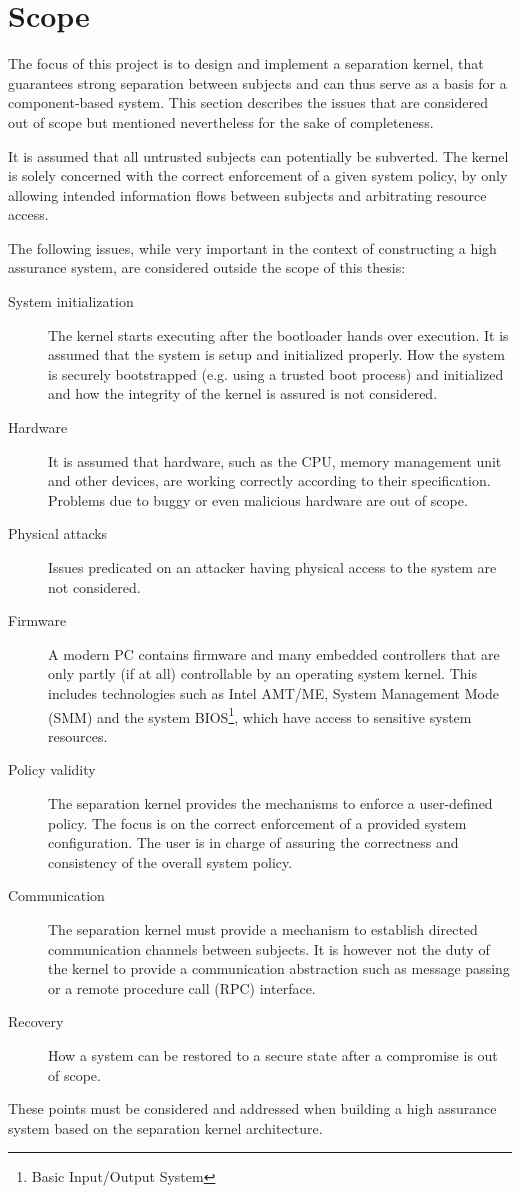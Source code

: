\section{Scope}
The focus of this project is to design and implement a separation kernel, that
guarantees strong separation between subjects and can thus serve as a basis for
a component-based system. This section describes the issues that are considered
out of scope but mentioned nevertheless for the sake of completeness.

It is assumed that all untrusted subjects can potentially be subverted. The
kernel is solely concerned with the correct enforcement of a given system
policy, by only allowing intended information flows between subjects and
arbitrating resource access.

The following issues, while very important in the context of constructing a
high assurance system, are considered outside the scope of this thesis:

\begin{description}
	\item[System initialization] The kernel starts executing after the
		bootloader hands over execution. It is assumed that the system is setup
		and initialized properly. How the system is securely bootstrapped (e.g.
		using a trusted boot process) and initialized and how the integrity of
		the kernel is assured is not considered.
	\item[Hardware] It is assumed that hardware, such as the CPU, memory
		management unit and other devices, are working correctly according to
		their specification. Problems due to buggy or even malicious hardware
		are out of scope.
	\item[Physical attacks] Issues predicated on an attacker having physical
		access to the system are not considered.
	\item[Firmware] A modern PC contains firmware and many embedded controllers
		that are only partly (if at all) controllable by an operating system
		kernel. This includes technologies such as Intel AMT/ME, System
		Management Mode (SMM) and the system
		BIOS\footnote{Basic Input/Output System}, which have access
		to sensitive system resources.
	\item[Policy validity] The separation kernel provides the mechanisms to
		enforce a user-defined policy. The focus is on the correct enforcement
		of a provided system configuration. The user is in charge of assuring
		the correctness and consistency of the overall system policy.
	\item[Communication] The separation kernel must provide a mechanism to
		establish directed communication channels between subjects.	It is
		however not the duty of the kernel to provide a	communication
		abstraction such as message passing or a remote procedure call (RPC)
		interface.
	\item[Recovery] How a system can be restored to a secure state after a
		compromise is out of scope.
\end{description}

These points must be considered and addressed when building a high assurance
system based on the separation kernel architecture.
